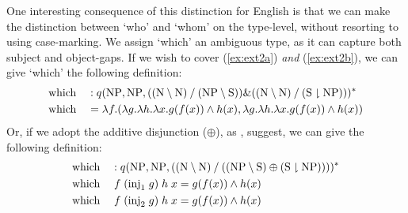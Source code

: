 One interesting consequence of this distinction for English is that we
can make the distinction between `who' and `whom' on the type-level,
without resorting to using case-marking.
We assign `which' an ambiguous type, as it can capture both subject
and object-gaps. If we wish to cover (\ref{ex:ext2a}) \emph{and}
(\ref{ex:ext2b}), we can give `which' the following definition:
\begin{alignat*}{3}
  &\text{which} &&: \tr[{q(\NP,\NP,((\N\impr\N)\impl(\NP\impr\S))\&((\N\impr\N)\impl(\S\downharpoonright\NP)))}]\\
  &\text{which} &&= \lambda{f}.(\lambda{g}.\lambda{h}.\lambda{x}.g(f(x))\wedge h(x),\lambda{g}.\lambda{h}.\lambda{x}.g(f(x))\wedge h(x))
\end{alignat*}
Or, if we adopt the additive disjunction ($\oplus$), as
\citet{lambek1961}, \citet{morrill2015} suggest, we can give the
following definition:
\begin{alignat*}{3}
  &\text{which} &&: \tr[{q(\NP,\NP,((\N\impr\N)\impl((\NP\impr\S)\oplus(\S\downharpoonright\NP))))}]\\
  &\text{which} &&\;f\;(\text{inj}_1\;g)\;h\;x = g(f(x))\wedge h(x)\\
  &\text{which} &&\;f\;(\text{inj}_2\;g)\;h\;x = g(f(x))\wedge h(x)
\end{alignat*}


